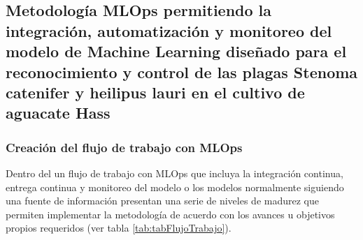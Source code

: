 
\subsection{Metodología MLOps permitiendo la integración, automatización y monitoreo del modelo de Machine Learning diseñado para el reconocimiento y control de las plagas Stenoma catenifer y heilipus lauri en el cultivo de aguacate Hass}

\subsubsection{Creación del flujo de trabajo con MLOps}

Dentro del un flujo de trabajo con MLOps que incluya la integración continua, entrega continua y monitoreo del modelo o los modelos normalmente siguiendo una fuente de información presentan una serie de niveles de madurez que permiten implementar la metodología de acuerdo con los avances u objetivos propios requeridos (ver tabla \ref{tab:tabFlujoTrabajo}).

